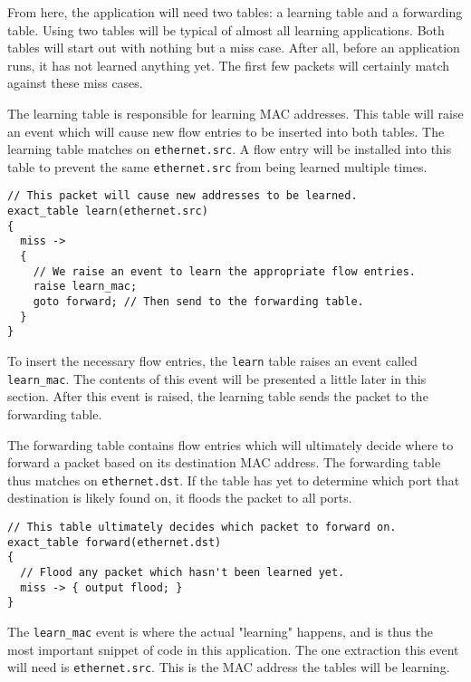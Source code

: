 From here, the application will need two tables: a learning table and a forwarding table.
Using two tables will be typical of almost all learning applications. Both
tables will start out with nothing but a miss case. After all, before an
application runs, it has not learned anything yet. The first few packets will
certainly match against these miss cases.

The learning table is responsible for learning MAC addresses. This table will raise an event which will
cause new flow entries to be inserted into both tables. The learning
table matches on \texttt{ethernet.src}. A flow entry will be installed into this
table to prevent the same \texttt{ethernet.src} from being learned multiple
times.

\begin{codepage}
\begin{lstlisting}
// This packet will cause new addresses to be learned.
exact_table learn(ethernet.src)
{
  miss ->
  {
  	// We raise an event to learn the appropriate flow entries.
  	raise learn_mac;
    goto forward; // Then send to the forwarding table.
  }
}
\end{lstlisting}
\end{codepage}

To insert the necessary flow entries, the \texttt{learn} table raises an event
called \texttt{learn\_mac}. The contents of this event will be presented a little later in this section.
After this event is raised, the learning table sends the packet to the
forwarding table.

The forwarding table contains flow entries which will ultimately decide where to
forward a packet based on its destination MAC address. The forwarding table thus
matches on \texttt{ethernet.dst}. If the table has yet to determine which port
that destination is likely found on, it floods the packet to all ports.

\begin{codepage}
\begin{lstlisting}
// This table ultimately decides which packet to forward on.
exact_table forward(ethernet.dst)
{
  // Flood any packet which hasn't been learned yet.
  miss -> { output flood; }
}
\end{lstlisting}
\end{codepage}

The \texttt{learn\_mac} event is where the actual
"learning" happens, and is thus the most important snippet of code in this
application. The one extraction this event will need is \texttt{ethernet.src}.
This is the MAC address the tables will be learning.

